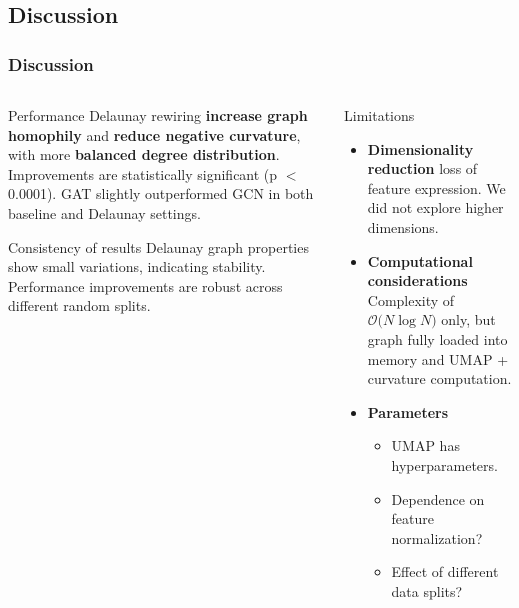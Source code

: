 \documentclass[10pt, aspectratio = 169]{beamer}
\begin{document}
\subsection{Discussion}
\begin{frame}
    \frametitle{Discussion}
    \begin{columns}[t]
        \begin{column}{0.5\textwidth}
            \begin{block}{Performance}
                Delaunay rewiring \textbf{increase graph homophily} and \textbf{reduce negative curvature},
                with more \textbf{balanced degree distribution}.
                Improvements are statistically significant (p $<$ 0.0001).
                GAT slightly outperformed GCN in both baseline and Delaunay settings.
            \end{block}

            \begin{block}{Consistency of results}
                Delaunay graph properties show small variations, indicating stability.
                Performance improvements are robust across different random splits.
            \end{block}
        \end{column}
        \begin{column}{0.5\textwidth}

            \begin{alertblock}{Limitations}
                \begin{itemize}
                    \item \textbf{Dimensionality reduction} loss of feature expression.
                    We did not explore higher dimensions.
                    \item \textbf{Computational considerations} 
                        Complexity of $\mathcal{O} \big( N \log N \big)$ only, but graph fully
                        loaded into memory and UMAP + curvature computation.
                    \item \textbf{Parameters}
                    \begin{itemize}
                        \item UMAP has hyperparameters.
                        \item Dependence on feature normalization?
                        \item Effect of different data splits?
                    \end{itemize}
                     
                \end{itemize}
            \end{alertblock}
        \end{column}
    \end{columns}
\end{frame}
\end{document}
